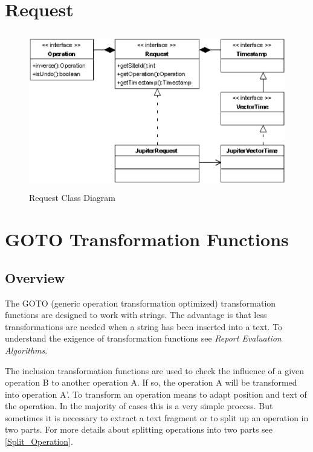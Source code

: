 \newpage
\section{Request}
\begin{figure}[H]
\centering
\includegraphics[height=6.87cm,width=12.09cm]{../../images/algo-impl/request_classdiagram.eps}
\caption{Request Class Diagram}
\label{Request Class Diagram}
\end{figure}


\newpage
\section{GOTO Transformation Functions}

\subsection{Overview}
The GOTO (generic operation transformation optimized) transformation functions are designed to work with strings. The advantage is that less transformations are needed when a string has been inserted into a text. To understand the exigence of transformation functions see \emph{Report Evaluation Algorithms}.

The inclusion transformation functions are used to check the influence of a given operation B to another operation A. If so, the operation A will be transformed into operation A'. To transform an operation means to adapt position and text of the operation. In the majority of cases this is a very simple process. But sometimes it is necessary to extract a text fragment or to split up an operation in two parts. For more details about splitting operations into two parts see \ref{Split_Operation}.

